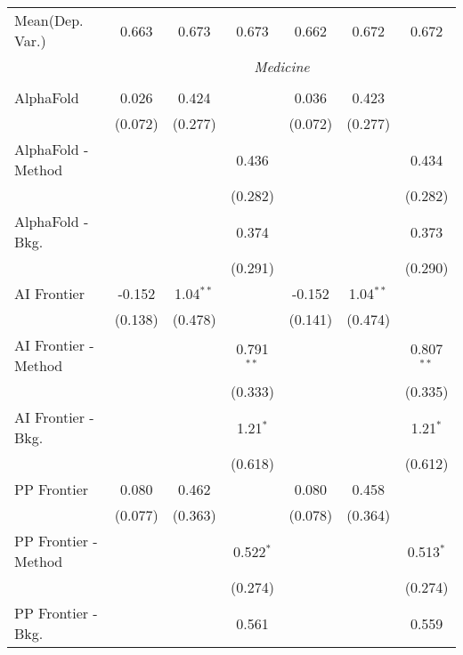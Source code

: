 \begin{tabular}{lcccccc}
Mean(Dep. Var.) & 0.663 & 0.673 & 0.673 & 0.662 & 0.672 & 0.672 \\
 & \multicolumn{6}{c}{\textit{Medicine}} \\ \\
   AlphaFold            & 0.026   & 0.424       &              & 0.036   & 0.423       &   \\   
                        & (0.072) & (0.277)     &              & (0.072) & (0.277)     &   \\   
   AlphaFold - Method   &         &             & 0.436        &         &             & 0.434\\   
                        &         &             & (0.282)      &         &             & (0.282)\\   
   AlphaFold - Bkg.     &         &             & 0.374        &         &             & 0.373\\   
                        &         &             & (0.291)      &         &             & (0.290)\\   
   AI Frontier          & -0.152  & 1.04$^{**}$ &              & -0.152  & 1.04$^{**}$ &   \\   
                        & (0.138) & (0.478)     &              & (0.141) & (0.474)     &   \\   
   AI Frontier - Method &         &             & 0.791$^{**}$ &         &             & 0.807$^{**}$\\   
                        &         &             & (0.333)      &         &             & (0.335)\\   
   AI Frontier - Bkg.   &         &             & 1.21$^{*}$   &         &             & 1.21$^{*}$\\   
                        &         &             & (0.618)      &         &             & (0.612)\\   
   PP Frontier          & 0.080   & 0.462       &              & 0.080   & 0.458       &   \\   
                        & (0.077) & (0.363)     &              & (0.078) & (0.364)     &   \\   
   PP Frontier - Method &         &             & 0.522$^{*}$  &         &             & 0.513$^{*}$\\   
                        &         &             & (0.274)      &         &             & (0.274)\\   
   PP Frontier - Bkg.   &         &             & 0.561        &         &             & 0.559\\   

\end{tabular}
